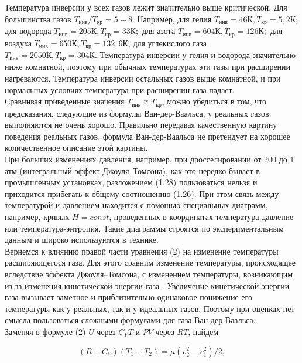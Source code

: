 Температура инверсии у всех газов лежит значительно выше критической. Для большинства газов $T_{инв}/T_{кр} = 5-8$. Например, для гелия $T_{инв} = 46К, T_{кр} = 5,2К$; для водорода $T_{инв} = 205К, T_{кр }= 33К;$ для азота $T_{инв} = 604 К, T_{кр} = 126 К;$ для воздуха $T_{инв} = 650 К, T_{кр} = 132,6 К$; для углекислого газа $T_{инв} = 2050 К, T_{кр} = 304 К.$ Температура инверсии у гелия и водорода значительно ниже комнатной, поэтому при обычных температурах эти газы при расширении нагреваются. Температура инверсии остальных газов выше комнатной, и при нормальных условиях температура при расширении газа падает.\\

Сравнивая приведенные значения $T_{инв}$ и $T_{кр}$, можно убедиться в том, что предсказания, следующие из формулы Ван-дер-Ваальса, у реальных газов выполняются не очень хорошо. Правильно передавая качественную картину поведения реальных газов, формула Ван-дер-Ваальса не претендует на хорошее количественное описание этой картины.\\

При больших изменениях давления, например, при дросселировании от 200 до 1 атм (интегральный эффект Джоуля–Томсона), как это нередко бывает в промышленных установках, разложением (1.28) пользоваться нельзя и приходится прибегать к общему соотношению (1.26). При этом связь между температурой и давлением находится с помощью специальных диаграмм, например, кривых $H = const$, проведенных в координатах температура-давление или температура-энтропия. Такие диаграммы строятся по экспериментальным данным и широко используются в технике.\\

Вернемся к влиянию правой части уравнения (2) на изменение температуры расширяющегося газа. Для этого сравним изменение температуры, происходящее вследствие эффекта Джоуля–Томсона, с
изменением температуры, возникающим из-за изменения кинетической энергии газа . Увеличение кинетической энергии газа вызывает заметное и приблизительно одинаковое понижение его температуры как у реальных, так и у идеальных газов. Поэтому при оценках нет смысла пользоваться сложными формулами для газа Ван-дер-Ваальса.\\

Заменяя в формуле (2) $U$ через $C_V T$ и $P V$ через $RT$, найдем

\begin{equation}
(R+C_V)(T_1 - T_2) = \mu(v_2^2 - v_1^2)/2,
\end{equation}

